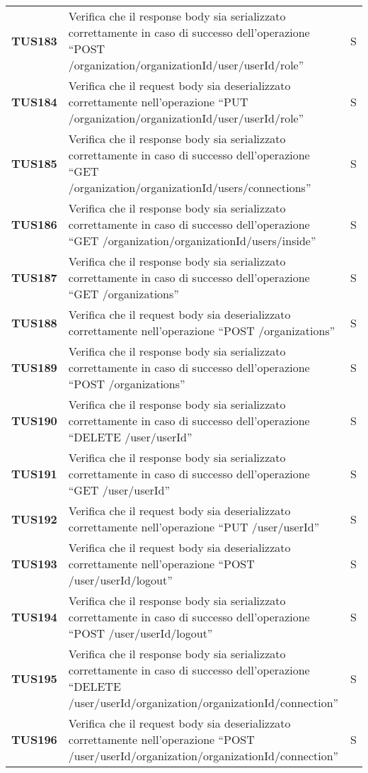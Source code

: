 \documentclass[../../piano-di-qualifica.tex]{subfiles}
\begin{document}
\begin{longtable}[H]{>{\centering\bfseries}m{3cm} >{}m{10cm} >{\centering\arraybackslash}m{3cm}}
  TUS183 & Verifica che il response body sia serializzato correttamente in caso di successo dell'operazione ``POST /organization/{organizationId}/user/{userId}/role'' & S \\
  TUS184 & Verifica che il request body sia deserializzato correttamente nell'operazione ``PUT /organization/{organizationId}/user/{userId}/role'' & S \\
  TUS185 & Verifica che il response body sia serializzato correttamente in caso di successo dell'operazione ``GET /organization/{organizationId}/users/connections'' & S \\
  TUS186 & Verifica che il response body sia serializzato correttamente in caso di successo dell'operazione ``GET /organization/{organizationId}/users/inside'' & S \\
  TUS187 & Verifica che il response body sia serializzato correttamente in caso di successo dell'operazione ``GET /organizations'' & S \\
  TUS188 & Verifica che il request body sia deserializzato correttamente nell'operazione ``POST /organizations'' & S \\
  TUS189 & Verifica che il response body sia serializzato correttamente in caso di successo dell'operazione ``POST /organizations'' & S \\
  TUS190 & Verifica che il response body sia serializzato correttamente in caso di successo dell'operazione ``DELETE /user/{userId}'' & S \\
  TUS191 & Verifica che il response body sia serializzato correttamente in caso di successo dell'operazione ``GET /user/{userId}'' & S \\
  TUS192 & Verifica che il request body sia deserializzato correttamente nell'operazione ``PUT /user/{userId}'' & S \\
  TUS193 & Verifica che il request body sia deserializzato correttamente nell'operazione ``POST /user/{userId}/logout'' & S \\
  TUS194 & Verifica che il response body sia serializzato correttamente in caso di successo dell'operazione ``POST /user/{userId}/logout'' & S \\
  TUS195 & Verifica che il response body sia serializzato correttamente in caso di successo dell'operazione ``DELETE /user/{userId}/organization/{organizationId}/connection'' & S \\
  TUS196 & Verifica che il request body sia deserializzato correttamente nell'operazione ``POST /user/{userId}/organization/{organizationId}/connection'' & S \\

\end{longtable}
\end{document}
